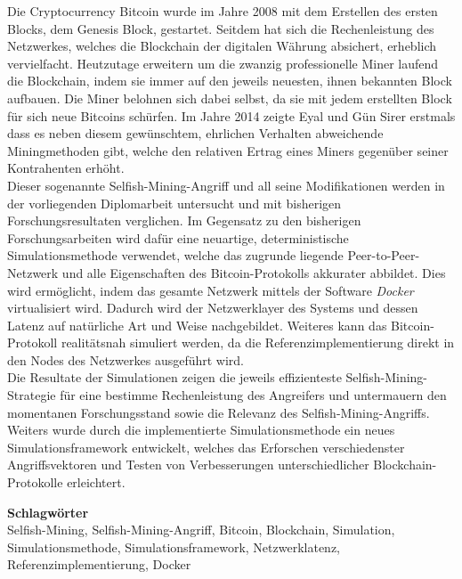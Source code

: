 Die Cryptocurrency Bitcoin wurde im Jahre 2008 mit dem Erstellen des ersten Blocks, dem Genesis Block, gestartet.
Seitdem hat sich die Rechenleistung des Netzwerkes, welches die Blockchain der digitalen Währung absichert, erheblich vervielfacht.
Heutzutage erweitern um die zwanzig professionelle Miner laufend die Blockchain, indem sie immer auf den jeweils neuesten, ihnen bekannten Block aufbauen.
Die Miner belohnen sich dabei selbst, da sie mit jedem erstellten Block für sich neue Bitcoins schürfen.
Im Jahre 2014 zeigte Eyal und Gün Sirer erstmals dass es neben diesem gewünschtem, ehrlichen Verhalten abweichende Miningmethoden gibt, welche den relativen Ertrag eines Miners gegenüber seiner Kontrahenten erhöht.\\
Dieser sogenannte Selfish-Mining-Angriff und all seine	 Modifikationen werden in der vorliegenden Diplomarbeit untersucht und mit bisherigen Forschungsresultaten verglichen.
Im Gegensatz zu den bisherigen Forschungsarbeiten wird dafür eine neuartige, deterministische Simulationsmethode verwendet, welche das zugrunde liegende Peer-to-Peer-Netzwerk und alle Eigenschaften des Bitcoin-Protokolls akkurater abbildet.
Dies wird ermöglicht, indem das gesamte Netzwerk mittels der Software \textit{Docker} virtualisiert wird.
Dadurch wird der Netzwerklayer des Systems und dessen Latenz auf natürliche Art und Weise nachgebildet.
Weiteres kann das Bitcoin-Protokoll realitätsnah simuliert werden, da die Referenzimplementierung direkt in den Nodes des Netzwerkes ausgeführt wird.\\
Die Resultate der Simulationen zeigen die jeweils effizienteste Selfish-Mining-Strategie für eine bestimme Rechenleistung des Angreifers und untermauern den momentanen Forschungsstand sowie die Relevanz des Selfish-Mining-Angriffs.
Weiters wurde durch die implementierte Simulationsmethode ein neues Simulationsframework entwickelt, welches das Erforschen verschiedenster Angriffsvektoren und Testen von Verbesserungen unterschiedlicher Blockchain-Protokolle erleichtert.

\bigskip
\noindent \textbf{Schlagwörter}\\
Selfish-Mining, Selfish-Mining-Angriff, Bitcoin, Blockchain, Simulation, Simulationsmethode, Simulationsframework, Netzwerklatenz, Referenzimplementierung, Docker
